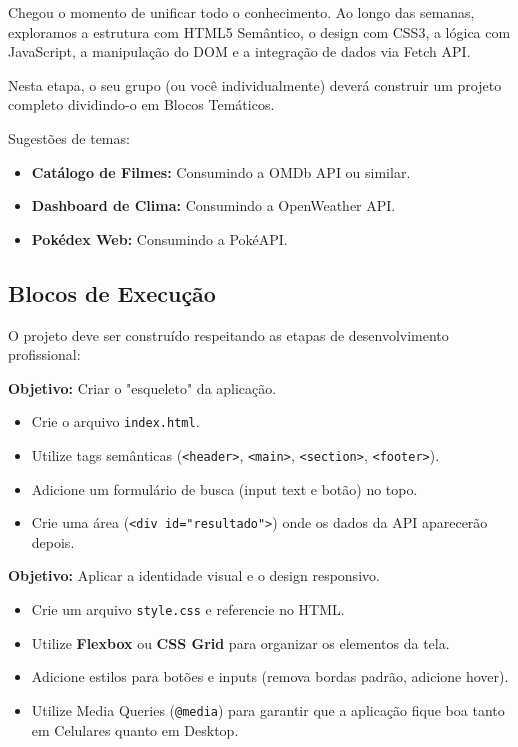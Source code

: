 \documentclass[12pt,a4paper]{article}
\begin{document}
Chegou o momento de unificar todo o conhecimento. Ao longo das semanas, exploramos a estrutura com HTML5 Semântico, o design com CSS3, a lógica com JavaScript, a manipulação do DOM e a integração de dados via Fetch API.

Nesta etapa, o seu grupo (ou você individualmente) deverá construir um projeto completo dividindo-o em Blocos Temáticos. 

\begin{boxDica}
Sugestões de temas: 
\begin{itemize}
    \item \textbf{Catálogo de Filmes:} Consumindo a OMDb API ou similar.
    \item \textbf{Dashboard de Clima:} Consumindo a OpenWeather API.
    \item \textbf{Pokédex Web:} Consumindo a PokéAPI.
\end{itemize}
\end{boxDica}

\subsection{Blocos de Execução}

O projeto deve ser construído respeitando as etapas de desenvolvimento profissional:

\begin{boxAtividade}
\textbf{Objetivo:} Criar o "esqueleto" da aplicação.
\begin{itemize}
    \item Crie o arquivo \texttt{index.html}.
    \item Utilize tags semânticas (\texttt{<header>}, \texttt{<main>}, \texttt{<section>}, \texttt{<footer>}).
    \item Adicione um formulário de busca (input text e botão) no topo.
    \item Crie uma área (\texttt{<div id="resultado">}) onde os dados da API aparecerão depois.
\end{itemize}
\end{boxAtividade}

\begin{boxAtividade}
\textbf{Objetivo:} Aplicar a identidade visual e o design responsivo.
\begin{itemize}
    \item Crie um arquivo \texttt{style.css} e referencie no HTML.
    \item Utilize \textbf{Flexbox} ou \textbf{CSS Grid} para organizar os elementos da tela.
    \item Adicione estilos para botões e inputs (remova bordas padrão, adicione hover).
    \item Utilize Media Queries (\texttt{@media}) para garantir que a aplicação fique boa tanto em Celulares quanto em Desktop.
\end{itemize}
\end{boxAtividade}
\end{document}
